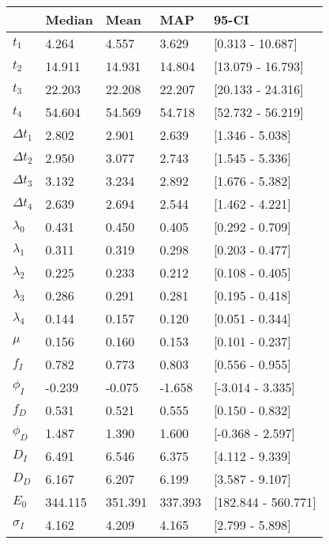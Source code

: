 \begin{tabular}{lllll}
\toprule
{} &   Median &     Mean &      MAP &                95-CI \\
\midrule
$t_1$        &    4.264 &    4.557 &    3.629 &     [0.313 - 10.687] \\
$t_2$        &   14.911 &   14.931 &   14.804 &    [13.079 - 16.793] \\
$t_3$        &   22.203 &   22.208 &   22.207 &    [20.133 - 24.316] \\
$t_4$        &   54.604 &   54.569 &   54.718 &    [52.732 - 56.219] \\
$\Delta t_1$ &    2.802 &    2.901 &    2.639 &      [1.346 - 5.038] \\
$\Delta t_2$ &    2.950 &    3.077 &    2.743 &      [1.545 - 5.336] \\
$\Delta t_3$ &    3.132 &    3.234 &    2.892 &      [1.676 - 5.382] \\
$\Delta t_4$ &    2.639 &    2.694 &    2.544 &      [1.462 - 4.221] \\
$\lambda_0$  &    0.431 &    0.450 &    0.405 &      [0.292 - 0.709] \\
$\lambda_1$  &    0.311 &    0.319 &    0.298 &      [0.203 - 0.477] \\
$\lambda_2$  &    0.225 &    0.233 &    0.212 &      [0.108 - 0.405] \\
$\lambda_3$  &    0.286 &    0.291 &    0.281 &      [0.195 - 0.418] \\
$\lambda_4$  &    0.144 &    0.157 &    0.120 &      [0.051 - 0.344] \\
$\mu$        &    0.156 &    0.160 &    0.153 &      [0.101 - 0.237] \\
$f_I$        &    0.782 &    0.773 &    0.803 &      [0.556 - 0.955] \\
$\phi_I$     &   -0.239 &   -0.075 &   -1.658 &     [-3.014 - 3.335] \\
$f_D$        &    0.531 &    0.521 &    0.555 &      [0.150 - 0.832] \\
$\phi_D$     &    1.487 &    1.390 &    1.600 &     [-0.368 - 2.597] \\
$D_I$        &    6.491 &    6.546 &    6.375 &      [4.112 - 9.339] \\
$D_D$        &    6.167 &    6.207 &    6.199 &      [3.587 - 9.107] \\
$E_0$        &  344.115 &  351.391 &  337.393 &  [182.844 - 560.771] \\
$\sigma_I$   &    4.162 &    4.209 &    4.165 &      [2.799 - 5.898] \\

\end{tabular}
